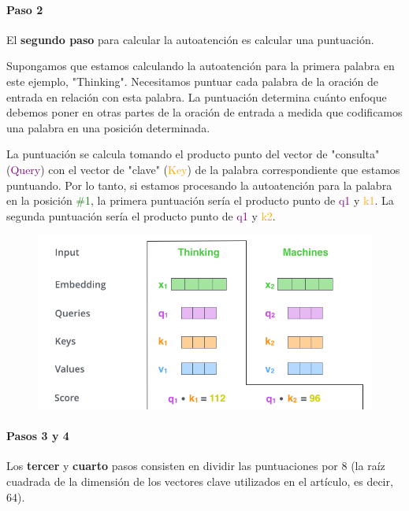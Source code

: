 \paragraph{Paso 2}

El \textbf{segundo paso} para calcular la autoatención es calcular una puntuación.

Supongamos que estamos calculando la autoatención para la primera palabra en este ejemplo, "Thinking". Necesitamos puntuar cada palabra de la oración de entrada en relación con esta palabra. La puntuación determina cuánto enfoque debemos poner en otras partes de la oración de entrada a medida que codificamos una palabra en una posición determinada.

La puntuación se calcula tomando el producto punto del vector de "consulta" (\textcolor{purple}{Query}) con el vector de "clave" (\textcolor{orange}{Key}) de la palabra correspondiente que estamos puntuando. Por lo tanto, si estamos procesando la autoatención para la palabra en la posición \textcolor{green}{\#1}, la primera puntuación sería el producto punto de \textcolor{purple}{q1} y \textcolor{orange}{k1}. La segunda puntuación sería el producto punto de \textcolor{purple}{q1} y \textcolor{orange}{k2}.

\begin{figure}[h]
  \centering
  \includegraphics[scale=0.4]{pics/transformer_self_attention_score.png}
\end{figure}

\paragraph{Pasos 3 y 4}

Los \textbf{tercer} y \textbf{cuarto} pasos consisten en dividir las puntuaciones por 8 (la raíz cuadrada de la dimensión de los vectores clave utilizados en el artículo, es decir, 64).

